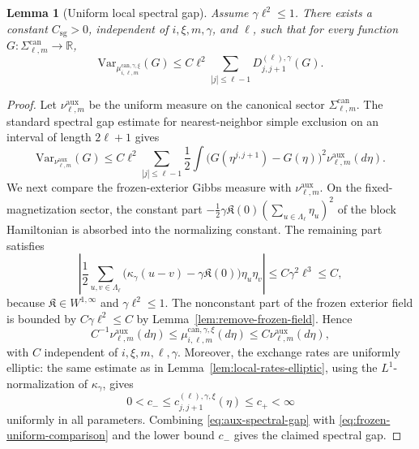 \documentclass{article}
\newtheorem{lemma}{Lemma}
\begin{document}
\begin{lemma}[Uniform local spectral gap]\label{lem:clean-one-block-spectral-gap}
Assume \(\gamma\ell^2\le 1\).  There exists a constant \(C_{\mathrm{sg}}>0\), independent of \(i,\xi,m,\gamma\), and \(\ell\), such that for every function \(G:\Sigma_{\ell,m}^{\mathrm{can}}\to\mathbb R\),
\[
\mathrm{Var}_{\mu_{i,\ell,m}^{\mathrm{can},\gamma,\xi}}(G)
\le
C\ell^2
\sum_{|j|\le \ell-1}
D_{j,j+1}^{(\ell),\gamma}(G).
\]
\end{lemma}

\begin{proof}
Let \(\nu_{\ell,m}^{\mathrm{aux}}\) be the uniform measure on the canonical sector \(\Sigma_{\ell,m}^{\mathrm{can}}\).  The standard spectral gap estimate for nearest-neighbor simple exclusion on an interval of length \(2\ell+1\) gives
\begin{equation}\label{eq:aux-spectral-gap}
\mathrm{Var}_{\nu_{\ell,m}^{\mathrm{aux}}}(G)
\le
C\ell^2
\sum_{|j|\le\ell-1}
\frac12
\int
\bigl(G(\eta^{j,j+1})-G(\eta)\bigr)^2
\nu_{\ell,m}^{\mathrm{aux}}(d\eta).
\end{equation}
We next compare the frozen-exterior Gibbs measure with \(\nu_{\ell,m}^{\mathrm{aux}}\).  On the fixed-magnetization sector, the constant part
\(
-\frac12\gamma\mathfrak K(0)\left(\sum_{u\in\Lambda_\ell}\eta_u\right)^2
\)
of the block Hamiltonian is absorbed into the normalizing constant.  The remaining part satisfies
\begin{equation}\label{eq:oneOscH}
    \left|
\frac12\sum_{u,v\in\Lambda_\ell}
\bigl(\kappa_\gamma(u-v)-\gamma\mathfrak K(0)\bigr)\eta_u\eta_v
\right|
\le C\gamma^2\ell^3\le C,
\end{equation}
because \(\mathfrak K\in W^{1,\infty}\) and \(\gamma\ell^2\le1\).  The nonconstant part of the frozen exterior field is bounded by \(C\gamma\ell^2\le C\) by Lemma~\ref{lem:remove-frozen-field}.  Hence
\begin{equation}\label{eq:frozen-uniform-comparison}
C^{-1}\nu_{\ell,m}^{\mathrm{aux}}(d\eta)
\le
\mu_{i,\ell,m}^{\mathrm{can},\gamma,\xi}(d\eta)
\le
C\nu_{\ell,m}^{\mathrm{aux}}(d\eta),
\end{equation}
with \(C\) independent of \(i,\xi,m,\ell,\gamma\).  Moreover, the exchange rates are uniformly elliptic: the same estimate as in Lemma~\ref{lem:local-rates-elliptic}, using the \(L^1\)-normalization of \(\kappa_\gamma\), gives
\[
0<c_-\le c_{j,j+1}^{(\ell),\gamma,\xi}(\eta)\le c_+<\infty
\]
uniformly in all parameters.  Combining \eqref{eq:aux-spectral-gap} with \eqref{eq:frozen-uniform-comparison} and the lower bound \(c_-\) gives the claimed spectral gap.
\end{proof}
\end{document}
